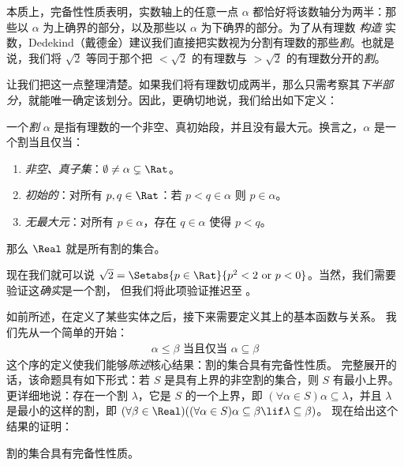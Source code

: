 \documentclass[../../../include/open-logic-section]{subfiles}
\begin{document}

本质上，完备性性质表明，实数轴上的任意一点 $\alpha$ 都恰好将该数轴分为两半：那些以 $\alpha$ 为上确界的部分，以及那些以 $\alpha$ 为下确界的部分。为了从有理数 \emph{构造} 实数，Dedekind（戴德金）建议我们直接把实数视为分割有理数的那些\emph{割}。也就是说，我们将 $\sqrt{2}$ 等同于那个把 $< \sqrt{2}$ 的有理数与 $> \sqrt{2}$ 的有理数分开的\emph{割}。

让我们把这一点整理清楚。如果我们将有理数切成两半，那么只需考察其\emph{下半部分}，就能唯一确定该划分。因此，更确切地说，我们给出如下定义：

\begin{defn}[割]
一个\emph{割} $\alpha$ 是指有理数的一个非空、真初始段，并且没有最大元。换言之，$\alpha$ 是一个割当且仅当：
\begin{enumerate}
	\item \emph{非空、真子集}：$\emptyset \neq \alpha \subsetneq \Rat$。
	\item \emph{初始的}：对所有 $p,q \in \Rat$：若 $p < q \in \alpha$ 则 $p \in \alpha$。
	\item \emph{无最大元}：对所有 $p \in \alpha$，存在 $q \in \alpha$ 使得 $p < q$。
\end{enumerate}
那么 $\Real$ 就是所有割的集合。
\end{defn}

现在我们就可以说 $\sqrt{2} = \Setabs{p \in \Rat}{p^2 < 2\text{
or }p < 0}$。当然，我们需要验证这\emph{确实}是一个割，
但我们将此项验证推迟至 。

如前所述，在定义了某些实体之后，接下来需要定义其上的基本函数与关系。
我们先从一个简单的开始：
\begin{align*}
	\alpha \leq \beta \text{ 当且仅当 }\alpha \subseteq \beta
\end{align*}
这个序的定义使我们能够\emph{陈述}核心结果：割的集合具有完备性性质。
完整展开的话，该命题具有如下形式：若 $S$ 是具有上界的非空割的集合，则 $S$ 有最小上界。
更详细地说：存在一个割 $\lambda$，它是 $S$ 的一个上界，即 $(\forall \alpha \in S)\alpha \subseteq \lambda$，并且 $\lambda$ 是最小的这样的割，即 $(\forall \beta \in \Real)((\forall \alpha \in S)\alpha \subseteq \beta \lif \lambda \subseteq \beta)$。
现在给出这个结果的证明：

\begin{thm}
割的集合具有完备性性质。
\end{thm}
\end{document}
